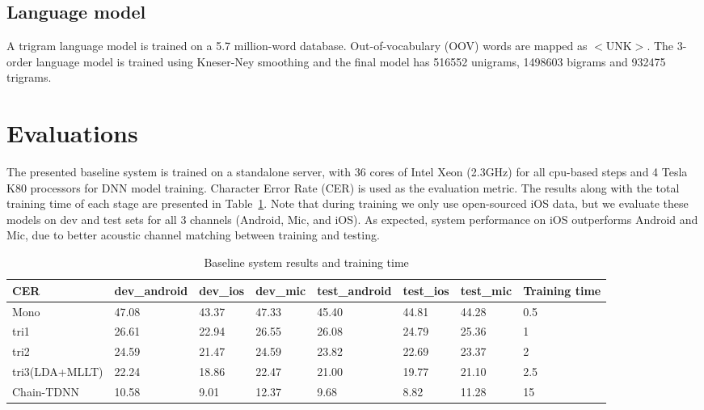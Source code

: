 \documentclass[a4paper]{article}
\begin{document}
\subsection{Language model}

A trigram language model is trained on a 5.7 million-word database. Out-of-vocabulary (OOV) words are mapped as $<$UNK$>$. The 3-order language model is trained using Kneser-Ney smoothing and the final model has 516552 unigrams, 1498603 bigrams and 932475 trigrams.

\section{Evaluations}

The presented baseline system is trained on a standalone server, with 36 cores of Intel Xeon (2.3GHz) for all cpu-based steps and 4
Tesla K80 processors for DNN model training. Character Error Rate (CER) is used as the evaluation metric. 
The results along with the total training time of each stage are presented in Table~\ref{tab:base}. 
Note that during training we only use open-sourced iOS data, but we evaluate
these models on dev and test sets for all 3 channels (Android, Mic, and iOS). As
expected, system performance on iOS outperforms Android and Mic, due to better
acoustic channel matching between training and testing.

\begin{table}[th]
  \caption{Baseline system results and training time}
  \label{tab:base}
  \centering
  \begin{tabular}{ llllllll }
    \toprule
    CER               &  dev\_android           &  dev\_ios           &  dev\_mic           & test\_android            &  test\_ios           &  test\_mic          &  Training time         \\
    \midrule
    Mono        &  47.08                 &  43.37             &  47.33             &  45.40                  &  44.81              &  44.28             &  0.5                   \\
    tri1    &  26.61                 &  22.94             &  26.55             &  26.08                  &  24.79              &  25.36             &  1                     \\
    tri2    &  24.59                 &  21.47             &  24.59             &  23.82                 &  22.69              &  23.37             &  2                     \\
    tri3(LDA+MLLT)          &  22.24                 &  18.86             &  22.47             &  21.00                  &  19.77              &  21.10             &  2.5                   \\
    Chain-TDNN              &  10.58                 &  9.01             &  12.37         &  9.68                  &  8.82             &  11.28              &  15                    \\
    \bottomrule
  \end{tabular}
\end{table}
\end{document}

